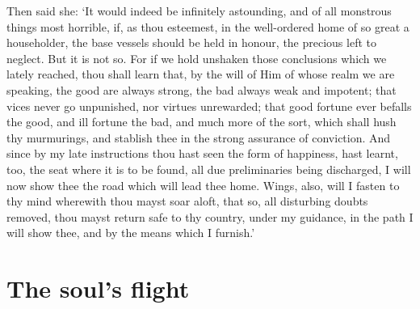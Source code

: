 \documentclass[11pt]{book}
\begin{document}
Then said she: `It would indeed be infinitely astounding, and of all
monstrous things most horrible, if, as thou esteemest, in the
well-ordered home of so great a householder, the base vessels should be
held in honour, the precious left to neglect. But it is not so. For if
we hold unshaken those conclusions which we lately reached, thou shall
learn that, by the will of Him of whose realm we are speaking, the good
are always strong, the bad always weak and impotent; that vices never go
unpunished, nor virtues unrewarded; that good fortune ever befalls the
good, and ill fortune the bad, and much more of the sort, which shall
hush thy murmurings, and stablish thee in the strong assurance of
conviction. And since by my late instructions thou hast seen the form of
happiness, hast learnt, too, the seat where it is to be found, all due
preliminaries being discharged, I will now show thee the road which will
lead thee home. Wings, also, will I fasten to thy mind wherewith thou
mayst soar aloft, that so, all disturbing doubts removed, thou mayst
return safe to thy country, under my guidance, in the path I will show
thee, and by the means which I furnish.'



\section{The soul's flight}
\end{document}
